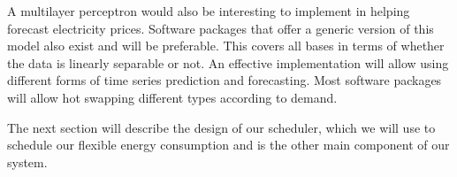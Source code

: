 A multilayer perceptron would also be interesting to implement in helping forecast electricity prices. Software packages that offer a generic version of this model also exist and will be preferable. This covers all bases in terms of whether the data is linearly separable or not. An effective implementation will allow using different forms of time series prediction and forecasting. Most software packages will allow hot swapping different types according to demand.

The next section will describe the design of our scheduler, which we will use to schedule our flexible energy consumption and is the other main component of our system. 

